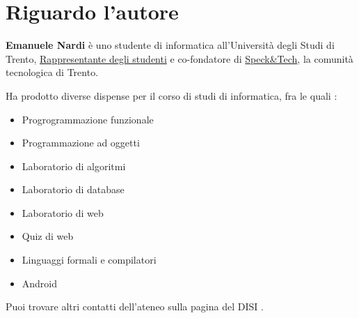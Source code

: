 \section*{Riguardo l'autore}

\textbf{Emanuele Nardi} è uno studente di informatica all'Università degli Studi di Trento, \href{https://www.facebook.com/rappresentantidisi/}{Rappresentante degli studenti} e co-fondatore di \href{http://speckand.tech}{Speck\&Tech}, la comunità tecnologica di Trento.

\medskip
Ha prodotto diverse dispense per il corso di studi di informatica, fra le quali%
\href{https://github.com/emanuelenardi?utf8=%E2%9C%93&tab=repositories&q=latex}{\ExternalLink}:

\begin{itemize}
	\item Progrogrammazione funzionale
	\item Programmazione ad oggetti
	\item Laboratorio di algoritmi
	\item Laboratorio di database
	\item Laboratorio di web
	\item Quiz di web
	\item Linguaggi formali e compilatori
	\item Android
\end{itemize}

\medskip
Puoi trovare altri contatti dell'ateneo sulla pagina del DISI%
\href{http://offertaformativa.unitn.it/it/l/informatica/contatti-e-referenti}{\ExternalLink}.
